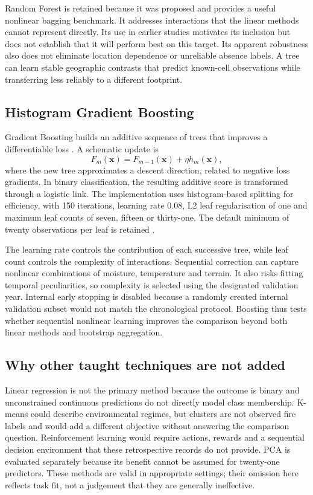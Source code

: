 \documentclass[conference,a4paper]{IEEEtran}
\begin{document}
Random Forest is retained because it was proposed and provides a useful nonlinear bagging benchmark. It addresses interactions that the linear methods cannot represent directly. Its use in earlier studies motivates its inclusion but does not establish that it will perform best on this target. Its apparent robustness also does not eliminate location dependence or unreliable absence labels. A tree can learn stable geographic contrasts that predict known-cell observations while transferring less reliably to a different footprint.

\subsection{Histogram Gradient Boosting}
Gradient Boosting builds an additive sequence of trees that improves a differentiable loss \citep{friedman}. A schematic update is
\begin{equation}
F_m(\mathbf x)=F_{m-1}(\mathbf x)+\eta h_m(\mathbf x),
\end{equation}
where the new tree approximates a descent direction, related to negative loss gradients. In binary classification, the resulting additive score is transformed through a logistic link. The implementation uses histogram-based splitting for efficiency, with 150 iterations, learning rate 0.08, L2 leaf regularisation of one and maximum leaf counts of seven, fifteen or thirty-one. The default minimum of twenty observations per leaf is retained \citep{sklearnboost}.

The learning rate controls the contribution of each successive tree, while leaf count controls the complexity of interactions. Sequential correction can capture nonlinear combinations of moisture, temperature and terrain. It also risks fitting temporal peculiarities, so complexity is selected using the designated validation year. Internal early stopping is disabled because a randomly created internal validation subset would not match the chronological protocol. Boosting thus tests whether sequential nonlinear learning improves the comparison beyond both linear methods and bootstrap aggregation.

\subsection{Why other taught techniques are not added}
Linear regression is not the primary method because the outcome is binary and unconstrained continuous predictions do not directly model class membership. K-means could describe environmental regimes, but clusters are not observed fire labels and would add a different objective without answering the comparison question. Reinforcement learning would require actions, rewards and a sequential decision environment that these retrospective records do not provide. PCA is evaluated separately because its benefit cannot be assumed for twenty-one predictors. These methods are valid in appropriate settings; their omission here reflects task fit, not a judgement that they are generally ineffective.
\end{document}
